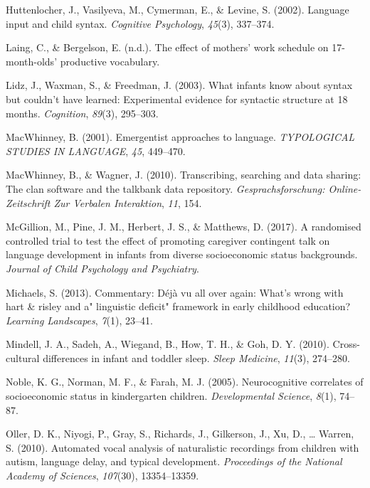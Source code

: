 \documentclass[man]{apa6}
\theoremstyle{definition}
\theoremstyle{definition}
\theoremstyle{definition}
\theoremstyle{remark}
\begin{document}
\leavevmode\hypertarget{ref-huttenlocher2002language}{}%
Huttenlocher, J., Vasilyeva, M., Cymerman, E., \& Levine, S. (2002).
Language input and child syntax. \emph{Cognitive Psychology},
\emph{45}(3), 337--374.

\leavevmode\hypertarget{ref-Laing_Bergelson_17}{}%
Laing, C., \& Bergelson, E. (n.d.). The effect of mothers' work schedule
on 17-month-olds' productive vocabulary.

\leavevmode\hypertarget{ref-lidz2003infants}{}%
Lidz, J., Waxman, S., \& Freedman, J. (2003). What infants know about
syntax but couldn't have learned: Experimental evidence for syntactic
structure at 18 months. \emph{Cognition}, \emph{89}(3), 295--303.

\leavevmode\hypertarget{ref-macwhinney2001emergentist}{}%
MacWhinney, B. (2001). Emergentist approaches to language.
\emph{TYPOLOGICAL STUDIES IN LANGUAGE}, \emph{45}, 449--470.

\leavevmode\hypertarget{ref-macwhinney2010transcribing}{}%
MacWhinney, B., \& Wagner, J. (2010). Transcribing, searching and data
sharing: The clan software and the talkbank data repository.
\emph{Gesprachsforschung: Online-Zeitschrift Zur Verbalen Interaktion},
\emph{11}, 154.

\leavevmode\hypertarget{ref-mcgillion2017randomised}{}%
McGillion, M., Pine, J. M., Herbert, J. S., \& Matthews, D. (2017). A
randomised controlled trial to test the effect of promoting caregiver
contingent talk on language development in infants from diverse
socioeconomic status backgrounds. \emph{Journal of Child Psychology and
Psychiatry}.

\leavevmode\hypertarget{ref-michaels2013commentary}{}%
Michaels, S. (2013). Commentary: Déjà vu all over again: What's wrong
with hart \& risley and a" linguistic deficit" framework in early
childhood education? \emph{Learning Landscapes}, \emph{7}(1), 23--41.

\leavevmode\hypertarget{ref-mindell2010cross}{}%
Mindell, J. A., Sadeh, A., Wiegand, B., How, T. H., \& Goh, D. Y.
(2010). Cross-cultural differences in infant and toddler sleep.
\emph{Sleep Medicine}, \emph{11}(3), 274--280.

\leavevmode\hypertarget{ref-noble2005neurocognitive}{}%
Noble, K. G., Norman, M. F., \& Farah, M. J. (2005). Neurocognitive
correlates of socioeconomic status in kindergarten children.
\emph{Developmental Science}, \emph{8}(1), 74--87.

\leavevmode\hypertarget{ref-oller2010automated}{}%
Oller, D. K., Niyogi, P., Gray, S., Richards, J., Gilkerson, J., Xu, D.,
\ldots{} Warren, S. (2010). Automated vocal analysis of naturalistic
recordings from children with autism, language delay, and typical
development. \emph{Proceedings of the National Academy of Sciences},
\emph{107}(30), 13354--13359.
\end{document}
